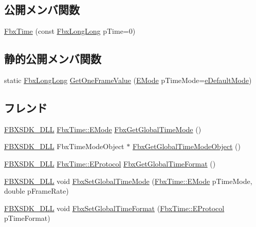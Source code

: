 \subsection*{公開メンバ関数}
\begin{DoxyCompactItemize}
\item 
\hyperlink{class_fbx_time_ae4511695181a014b707b2f62f264b070}{Fbx\+Time} (const \hyperlink{fbxtypes_8h_ac34da60c22b0a7e1156e5480da7d71f1}{Fbx\+Long\+Long} p\+Time=0)
\end{DoxyCompactItemize}
\subsection*{静的公開メンバ関数}
\begin{DoxyCompactItemize}
\item 
static \hyperlink{fbxtypes_8h_ac34da60c22b0a7e1156e5480da7d71f1}{Fbx\+Long\+Long} \hyperlink{class_fbx_time_a145760264d23eecf6719039fb3d6293f}{Get\+One\+Frame\+Value} (\hyperlink{class_fbx_time_acc529b00a0e8d4c3da3702449ca93031}{E\+Mode} p\+Time\+Mode=\hyperlink{class_fbx_time_acc529b00a0e8d4c3da3702449ca93031a1490a2efc4429bf125761d75f2aa06a6}{e\+Default\+Mode})
\end{DoxyCompactItemize}
\subsection*{フレンド}
\begin{DoxyCompactItemize}
\item 
\hyperlink{fbxarch_8h_a25d1298b33c31da5dbed969e0d4b4bc1}{F\+B\+X\+S\+D\+K\+\_\+\+D\+LL} \hyperlink{class_fbx_time_acc529b00a0e8d4c3da3702449ca93031}{Fbx\+Time\+::\+E\+Mode} \hyperlink{class_fbx_time_a1dd5082c49e4cf431a4f0ed108acb9ed}{Fbx\+Get\+Global\+Time\+Mode} ()
\item 
\hyperlink{fbxarch_8h_a25d1298b33c31da5dbed969e0d4b4bc1}{F\+B\+X\+S\+D\+K\+\_\+\+D\+LL} Fbx\+Time\+Mode\+Object $\ast$ \hyperlink{class_fbx_time_a0d2b00c87c206774bfa262d0d3c7880c}{Fbx\+Get\+Global\+Time\+Mode\+Object} ()
\item 
\hyperlink{fbxarch_8h_a25d1298b33c31da5dbed969e0d4b4bc1}{F\+B\+X\+S\+D\+K\+\_\+\+D\+LL} \hyperlink{class_fbx_time_a10ffa1fdce0aa7f63ec24bdd23afff4b}{Fbx\+Time\+::\+E\+Protocol} \hyperlink{class_fbx_time_a9780c5449fc7187b48e128c779706a06}{Fbx\+Get\+Global\+Time\+Format} ()
\item 
\hyperlink{fbxarch_8h_a25d1298b33c31da5dbed969e0d4b4bc1}{F\+B\+X\+S\+D\+K\+\_\+\+D\+LL} void \hyperlink{class_fbx_time_a8d274550abe4c6890b2fa0da734f6530}{Fbx\+Set\+Global\+Time\+Mode} (\hyperlink{class_fbx_time_acc529b00a0e8d4c3da3702449ca93031}{Fbx\+Time\+::\+E\+Mode} p\+Time\+Mode, double p\+Frame\+Rate)
\item 
\hyperlink{fbxarch_8h_a25d1298b33c31da5dbed969e0d4b4bc1}{F\+B\+X\+S\+D\+K\+\_\+\+D\+LL} void \hyperlink{class_fbx_time_a765fa4f060e2aaca17ba5d41ddb72b1f}{Fbx\+Set\+Global\+Time\+Format} (\hyperlink{class_fbx_time_a10ffa1fdce0aa7f63ec24bdd23afff4b}{Fbx\+Time\+::\+E\+Protocol} p\+Time\+Format)
\end{DoxyCompactItemize}
